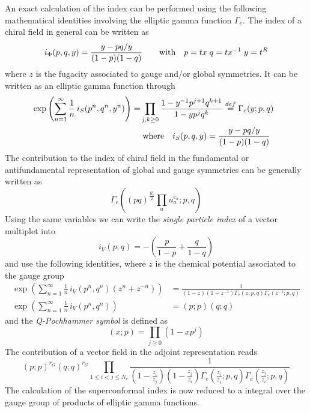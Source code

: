 An exact calculation of the index can be performed using the following mathematical identities involving the elliptic gamma function $\Gamma_e$.
The index of a chiral field in general can be written as
\begin{equation}
i_{\Phi} (p,q,y) = \frac{y - pq/y}{(1-p)(1-q)} \qquad \hbox{with} \quad p=tx \; q=t x^{-1} \; y = t^R
\end{equation}
where $z$ is the fugacity associated to gauge and/or global symmetries.
It can be written as an elliptic gamma function through
\begin{align}
 \exp \left(  
\sum_{n=1}^{\infty} \frac{1}{n} \, i_S(p^n,q^n,y^n) \right)=
& \prod_{j,k \geq 0} \frac{1 - y^{-1}p^{j+1}q^{k+1}}{1 - y p^j q^k}
\overset{def}{=} 
\Gamma_e ( y; p, q) 
\\
& \; \hbox{where} \quad i_S(p,q,y) = \frac{y - pq/y}{(1-p)(1-q)} \quad
\end{align}
The contribution to the index of chiral field in the fundamental or antifundamental representation of global and gauge symmetries can be generally
 written as
\begin{equation}
\Gamma_e \left(   (pq)^{\frac{R_i}{2}} \prod_a u_a^{e_a} ; p ,q \right)
\end{equation}
Using the same variables we can write the \emph{single particle index} of a vector multiplet into
\begin{equation}
i_V(p,q) = - \left( \frac{p}{1-p} + \frac{q}{1-q} \right)
\end{equation}
and use the following identities, where $z$ is the chemical potential associated to the gauge group
\begin{align}
\exp \left(  
\sum_{n=1}^{\infty} \frac{1}{n}\, i_V(p^n,q^n) ( z^n + z^{-n}) \right) & = \frac{1}{(1-z)(1-z^{-1}) \Gamma_e(z;p,q) \Gamma_e(z^{-1};p,q)}
\\
\exp \left(
\sum_{n=1}^{\infty} \frac{1}{n} \, i_V(p^n,q^n) \right) & = (p;p) (q;q)
\end{align}
and the \emph{Q-Pochhammer symbol} is defined as
\begin{equation}
(x;p) = \prod_{j \geq 0} ( 1- x p^j)
\end{equation}
The contribution of a vector field in the adjoint representation reads
\begin{equation}
(p;p)^{r_G} (q;q)^{r_G} \prod_{1 \leq i < j \leq N_c} \frac{1}{(1-\frac{z_i}{z_j})(1-\frac{z_j}{z_i}) \Gamma_e(\frac{z_i}{z_j};p,q) \Gamma_e(\frac{z_j}{z_i};p,q)}
\end{equation}
The calculation of the superconformal index is now reduced to a integral over the gauge group of products of elliptic gamma functions.\\
